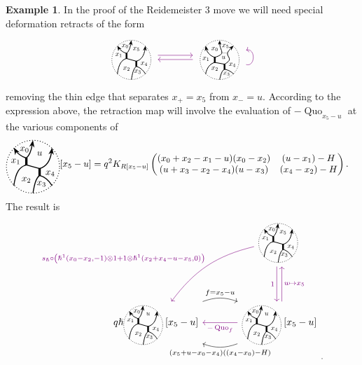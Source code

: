 \documentclass{article}
\DeclareMathOperator{\Quo}{Quo}
\theoremstyle{plain} %
\theoremstyle{definition} %
\newtheorem{example}[theorem]{Example}
\theoremstyle{remark} %
\begin{document}
\begin{example}
	In the proof of the Reidemeister 3 move we will need special deformation retracts of the form
	\[
	\begin{tikzcd}[column sep=large, ampersand replacement=\&]
		{\scalebox{0.7}{\ThickLThickRStandard}} 
		\arrow[r, shift left=0.5ex, color=violet] 
		\arrow[r, leftarrow, shift right=0.5ex, swap, color=violet] 
		\& 
		{\scalebox{0.7}{\ThinRThickLThickRStandard{u}}} 
		\arrow[loop right, distance=1em, in=15, out=-15, ,swap, color=violet]
	\end{tikzcd}
	\]
	removing the thin edge that separates $x_+=x_5$ from $x_-=u$. According to the expression above, the retraction map will involve the evaluation of $-\Quo_{x_5-u}$ at the various components of
	\begin{align*}
		{\ThickLThickR{x_0}{x_1}{x_2}{x_3}{x_4}{u}} [x_5-u]
		& = q^2 K_{R[x_5-u]}
		\begin{pmatrix}
			(x_0+x_2-x_1-u)(x_0-x_2) 
			& 
			(u-x_1)-H
			\\
			(u+x_3-x_2-x_4)(u-x_3) 
			& 
			(x_4-x_2)-H
		\end{pmatrix}.
	\end{align*}
	The result is
	\[
	\begin{tikzcd}[column sep=large]
		&
		\scalebox{0.7}{\ThickLThickRStandard} 
		\ar[dd, shift right=0.6ex, "1", swap, color=violet]
		\ar[dd, leftarrow, shift left=0.6ex, "u\mapsto x_5", color=violet]
		\ar[ddl, "{s_\hslash\circ\left(\hslash^1(x_0-x_2,-1)\otimes 1+1\otimes\hslash^1(x_2+x_4-u-x_5,0)\right)}", bend right=20, swap, color=violet]
		\\
		\\
		q \hslash  \scalebox{0.7}{\ThickLThickR{x_0}{x_1}{x_2}{x_3}{x_4}{u}}[x_5-u]
		\arrow[r, "f=x_5-u", shift left=5ex, bend left=20, start anchor=east, end anchor=west]
		& 
		\scalebox{0.7}{\ThickLThickR{x_0}{x_1}{x_2}{x_3}{x_4}{u}}[x_5-u]
		\ar[l, "-\Quo_f", color=violet]
		\ar[l, "(x_5+u-x_0-x_4)((x_4-x_0)-H)", shift left=5ex, bend left=20, start anchor=west, end anchor=east]
	\end{tikzcd}_.
	\]
\end{example}
\end{document}
